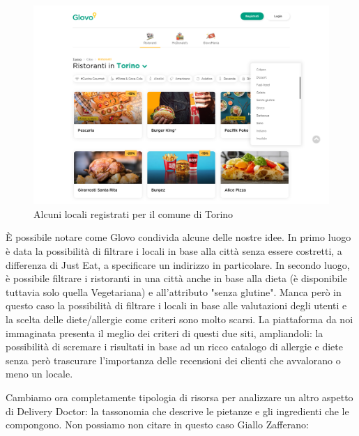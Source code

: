 \documentclass[12pt]{article}
\begin{document}
\begin{figure}[H]
    \centering
    \includegraphics[width=12cm]{files/glovo.png}
    \caption{Alcuni locali registrati per il comune di Torino}
\end{figure}
\`{E} possibile notare come Glovo condivida alcune delle nostre idee.\newline
In primo luogo è data la possibilità di filtrare i locali in base alla città senza essere costretti, a differenza di Just Eat, a specificare un indirizzo in particolare. In secondo luogo, è possibile filtrare i ristoranti in una città anche in base alla dieta (è disponibile tuttavia solo quella Vegetariana) e all'attributo "senza glutine". Manca però in questo caso la possibilità di filtrare i locali in base alle valutazioni degli utenti e la scelta delle diete/allergie come criteri sono molto scarsi. \newline
La piattaforma da noi immaginata presenta il meglio dei criteri di questi due siti, ampliandoli: la possibilità di scremare i risultati in base ad un ricco catalogo di allergie e diete senza però trascurare l'importanza delle recensioni dei clienti che avvalorano o meno un locale.
\par 
Cambiamo ora completamente tipologia di risorsa per analizzare un altro aspetto di Delivery Doctor: la tassonomia che descrive le pietanze e gli ingredienti che le compongono. Non possiamo non citare in questo caso Giallo Zafferano:
\end{document}

